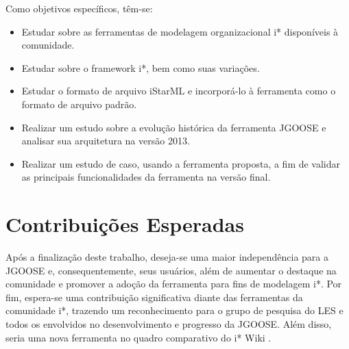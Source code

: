              Como objetivos específicos, têm-se:
            \begin{itemize}
                \item
                Estudar sobre as ferramentas de modelagem organizacional i* disponíveis à comunidade.
                \item
                Estudar sobre o framework i*, bem como suas variações.
                \item
                Estudar o formato de arquivo iStarML e incorporá-lo à ferramenta como o formato de arquivo padrão.
                \item
                Realizar um estudo sobre a evolução histórica da ferramenta JGOOSE e analisar sua arquitetura na versão 2013.
                \item
                Realizar um estudo de caso, usando a ferramenta proposta, a fim de validar as principais funcionalidades da ferramenta na versão final.
            \end{itemize}
    \section{Contribuições Esperadas}
        \label{cap:introducao:sec:contribuicoes}
        Após a finalização deste trabalho, deseja-se
            uma maior independência para a JGOOSE e, consequentemente, seus usuários,
            além de aumentar o destaque na comunidade e promover a adoção da ferramenta para fins de modelagem i*.
            Por fim, espera-se uma contribuição significativa diante das ferramentas da comunidade i*,
            trazendo um reconhecimento para o grupo de pesquisa do LES e todos os envolvidos no desenvolvimento e progresso da JGOOSE.
            Além disso, seria uma nova ferramenta no quadro comparativo do i* Wiki \cite{site2013iwiki}.
